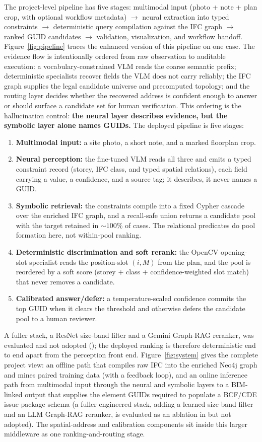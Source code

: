 The project-level pipeline has five stages: multimodal input (photo + note + plan crop, with optional
workflow metadata) $\to$ neural extraction into typed constraints $\to$ deterministic query compilation
against the IFC graph $\to$ ranked GUID candidates $\to$ validation, visualization, and workflow
handoff. Figure~\ref{fig:pipeline} traces the enhanced version of this pipeline on one case. The
evidence flow is intentionally ordered from raw observation to auditable execution: a
vocabulary-constrained VLM reads the coarse semantic prefix; deterministic specialists recover fields
the VLM does not carry reliably; the IFC graph supplies the legal candidate universe and precomputed
topology; and the routing layer decides whether the recovered address is confident enough to answer or
should surface a candidate set for human verification. This ordering is the hallucination control:
\textbf{the neural layer describes evidence, but the symbolic layer alone names GUIDs.}
The deployed pipeline is five stages:
\begin{enumerate}
\item \textbf{Multimodal input:} a site photo, a short note, and a marked floorplan crop.
\item \textbf{Neural perception:} the fine-tuned VLM reads all three and emits a typed constraint
record (storey, IFC class, and typed spatial relations), each field carrying a value, a confidence,
and a source tag; it describes, it never names a GUID.
\item \textbf{Symbolic retrieval:} the constraints compile into a fixed Cypher cascade over the
enriched IFC graph, and a recall-safe union returns a candidate pool with the target retained in
${\sim}100\%$ of cases. The relational predicates do pool formation here, not within-pool ranking.
\item \textbf{Deterministic discrimination and soft rerank:} the OpenCV opening-slot specialist reads
the position-slot $(i,M)$ from the plan, and the pool is reordered by a soft score (storey $+$ class
$+$ confidence-weighted slot match) that never removes a candidate.
\item \textbf{Calibrated answer/defer:} a temperature-scaled confidence commits the top GUID when it
clears the threshold and otherwise defers the candidate pool to a human reviewer.
\end{enumerate}
A fuller stack, a ResNet size-band filter and a Gemini Graph-RAG reranker, was evaluated and not
adopted (); the deployed ranking is therefore deterministic end to end apart
from the perception front end.
Figure~\ref{fig:system} gives the complete project view: an offline path that compiles raw IFC into
the enriched Neo4j graph and mines paired training data (with a feedback loop), and an online
inference path from multimodal input through the neural and symbolic layers to a
BIM-linked output that supplies the element GUIDs required to populate a BCF/CDE issue-package
schema (a fuller engineered stack, adding a learned size-band filter and an LLM Graph-RAG reranker, is
evaluated as an ablation in  but not adopted). The spatial-address and calibration components sit inside this
larger middleware as one ranking-and-routing stage.

